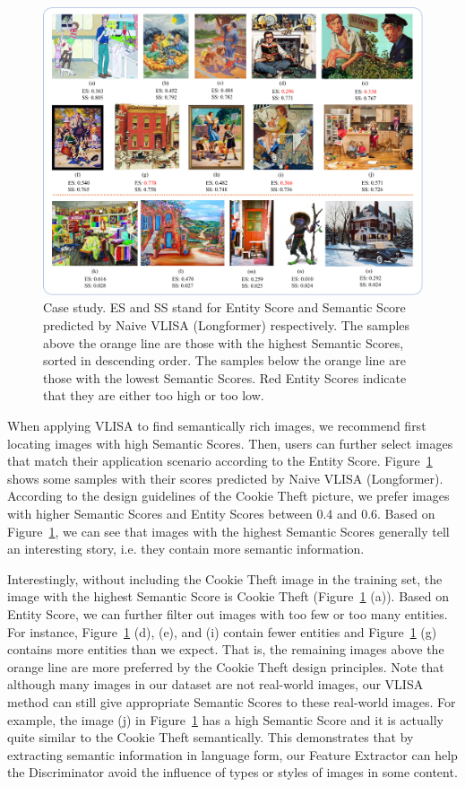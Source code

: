 \begin{figure}[ht]
    \centering
    \includegraphics[scale=0.5]{figs/pred_case3.pdf}
    \caption{Case study. ES and SS stand for Entity Score and Semantic Score predicted by Naive VLISA (Longformer) respectively. The samples above the orange line are those with the highest Semantic Scores, sorted in descending order. The samples below the orange line are those with the lowest Semantic Scores. Red Entity Scores indicate that they are either too high or too low.
    }
    \label{pred_case}
\end{figure}

When applying VLISA to find semantically rich images, we recommend first locating images with high Semantic Scores. 
Then, users can further select images that match their application scenario according to the Entity Score.
Figure~\ref{pred_case} shows some samples with their scores predicted by Naive VLISA (Longformer).
According to the design guidelines of the Cookie Theft picture, we prefer images with higher Semantic Scores and Entity Scores between 0.4 and 0.6.
Based on Figure~\ref{pred_case}, we can see that images with the highest Semantic Scores generally tell an interesting story, i.e. they contain more semantic information.

Interestingly, without including the Cookie Theft image in the training set, the image with the highest Semantic Score is Cookie Theft (Figure~\ref{pred_case} (a)).
Based on Entity Score, we can further filter out images with too few or too many entities. 
For instance, Figure~\ref{pred_case} (d), (e), and (i) contain fewer entities and Figure~\ref{pred_case} (g) contains more entities than we expect.
That is, the remaining images above the orange line are more preferred by the Cookie Theft design principles.
Note that although many images in our dataset are not real-world images, our VLISA method can still give appropriate Semantic Scores to these real-world images.
For example, the image (j) in Figure~\ref{pred_case} has a high Semantic Score and it is actually quite similar to the Cookie Theft semantically.
This demonstrates that by extracting semantic information in language form, our Feature Extractor can help the Discriminator avoid the influence of types or styles of images in some content.

